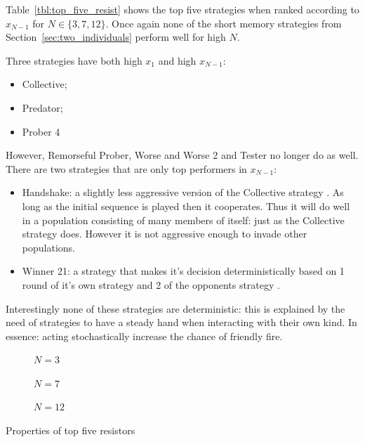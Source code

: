 \documentclass{article}
\begin{document}
Table~\ref{tbl:top_five_resist} shows the top five strategies when ranked
according to \(x_{N-1}\) for \(N\in\{3, 7, 12\}\).
Once again none of the short memory strategies from
Section~\ref{sec:two_individuals} perform well for high \(N\).

Three strategies have both high \(x_1\) and high \(x_{N-1}\):

\begin{itemize}
    \item Collective;
    \item Predator;
    \item Prober 4
\end{itemize}

However, Remorseful Prober, Worse and Worse 2 and Tester no longer do as well.
There are two strategies that are only top performers in \(x_{N-1}\):

\begin{itemize}
    \item Handshake: a slightly less aggressive version of the Collective
        strategy \cite{robson1989}. As long as the initial sequence is played
        then it cooperates. Thus it will do well in a population consisting of
        many members of itself: just as the Collective strategy does. However it
        is not aggressive enough to invade other populations.
    \item Winner 21: a strategy that makes it's decision deterministically based
        on 1 round of it's own strategy and 2 of the opponents strategy
        \cite{Mathieu2015}.
\end{itemize}

Interestingly none of these strategies are deterministic: this is explained by
the need of strategies to have a steady hand when interacting with their own
kind. In essence: acting stochastically increase the chance of friendly fire.


\begin{table}[!hbtp]
    \begin{subfigure}[t]{\textwidth}
        \centering
        
        \caption{\(N=3\)}
    \end{subfigure}
    \begin{subfigure}[t]{\textwidth}
        \centering
        
        \caption{\(N=7\)}
    \end{subfigure}
    \begin{subfigure}[t]{\textwidth}
        \centering
        
        \caption{\(N=12\)}
    \end{subfigure}
    \caption{Properties of top five resistors}
    \label{tbl:top_five_resist}
\end{table}
\end{document}
